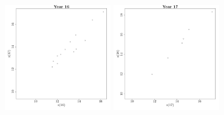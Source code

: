 \documentclass{article}\usepackage[]{graphicx}\usepackage[]{color}
\newenvironment{knitrout}{}{} %
\begin{document}
\begin{knitrout}
\includegraphics[width=0.35\textwidth]{figure/Reshaping16} 
\includegraphics[width=0.35\textwidth]{figure/Reshaping17} 

\end{knitrout}
\end{document}
